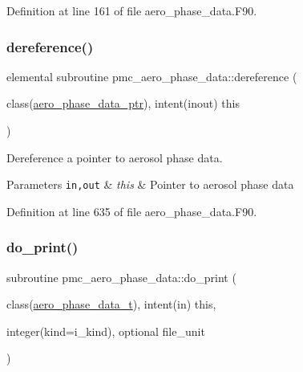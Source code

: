 Definition at line 161 of file aero\+\_\+phase\+\_\+data.\+F90.

\mbox{\label{namespacepmc__aero__phase__data_a4fe52583490828dad2d1b882b951679d}} 
\subsubsection{\texorpdfstring{dereference()}{dereference()}}
{\footnotesize\ttfamily elemental subroutine pmc\+\_\+aero\+\_\+phase\+\_\+data\+::dereference (\begin{DoxyParamCaption}\item[{class(\mbox{\hyperlink{structpmc__aero__phase__data_1_1aero__phase__data__ptr}{aero\+\_\+phase\+\_\+data\+\_\+ptr}}), intent(inout)}]{this }\end{DoxyParamCaption})\hspace{0.3cm}{\ttfamily [private]}}



Dereference a pointer to aerosol phase data. 


\begin{DoxyParams}[1]{Parameters}
\mbox{\tt in,out}  & {\em this} & Pointer to aerosol phase data \\
\hline
\end{DoxyParams}


Definition at line 635 of file aero\+\_\+phase\+\_\+data.\+F90.

\mbox{\label{namespacepmc__aero__phase__data_aaf65be8c5ab43c4930479af66b8632b7}} 
\subsubsection{\texorpdfstring{do\+\_\+print()}{do\_print()}}
{\footnotesize\ttfamily subroutine pmc\+\_\+aero\+\_\+phase\+\_\+data\+::do\+\_\+print (\begin{DoxyParamCaption}\item[{class(\mbox{\hyperlink{structpmc__aero__phase__data_1_1aero__phase__data__t}{aero\+\_\+phase\+\_\+data\+\_\+t}}), intent(in)}]{this,  }\item[{integer(kind=i\+\_\+kind), optional}]{file\+\_\+unit }\end{DoxyParamCaption})\hspace{0.3cm}{\ttfamily [private]}}




